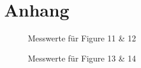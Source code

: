 
\section{Anhang}

\begin{figure}[H]
\centering
{}
  \caption{Messwerte f\"ur Figure 11 \& 12}
\end{figure}

\begin{figure}[H]
  \centering
 \caption{Messwerte f\"ur Figure 13 \& 14}
\end{figure}
